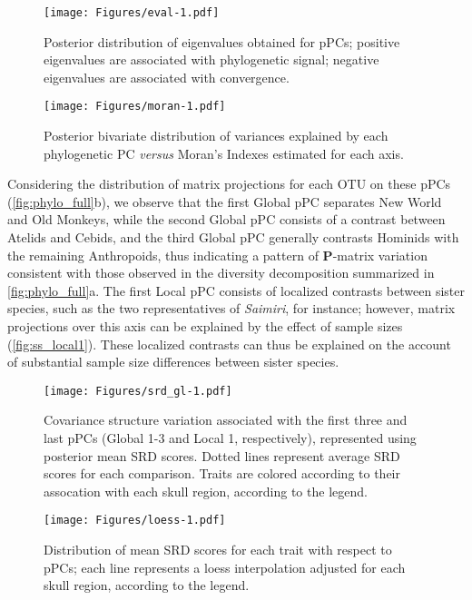 \documentclass[12pt,twoside]{report}
\begin{document}
\begin{figure}[htbp]
\centering
\texttt{[image: Figures/eval-1.pdf]}
\caption{Posterior distribution of eigenvalues obtained for pPCs;
positive eigenvalues are associated with phylogenetic signal; negative
eigenvalues are associated with convergence. \label{fig:eval}}
\end{figure}

\begin{figure}[htbp]
\centering
\texttt{[image: Figures/moran-1.pdf]}
\caption{Posterior bivariate distribution of variances explained by each
phylogenetic PC \emph{versus} Moran's Indexes estimated for each axis.
\label{fig:moran}}
\end{figure}

Considering the distribution of matrix projections for each OTU on these
pPCs (\autoref{fig:phylo_full}b), we observe that the first Global pPC
separates New World and Old Monkeys, while the second Global pPC
consists of a contrast between Atelids and Cebids, and the third Global
pPC generally contrasts Hominids with the remaining Anthropoids, thus
indicating a pattern of $\mathbf{P}$-matrix variation consistent with
those observed in the diversity decomposition summarized in
\autoref{fig:phylo_full}a. The first Local pPC consists of localized
contrasts between sister species, such as the two representatives of
\emph{Saimiri}, for instance; however, matrix projections over this axis
can be explained by the effect of sample sizes
(\autoref{fig:ss_local1}). These localized contrasts can thus be
explained on the account of substantial sample size differences between
sister species.

\begin{figure}[htbp]
\centering
\texttt{[image: Figures/srd\_gl-1.pdf]}
\caption{Covariance structure variation associated with the first three
and last pPCs (Global 1-3 and Local 1, respectively), represented using
posterior mean SRD scores. Dotted lines represent average SRD scores for
each comparison. Traits are colored according to their assocation with
each skull region, according to the legend. \label{fig:srd_gl}}
\end{figure}

\begin{figure}[htbp]
\centering
\texttt{[image: Figures/loess-1.pdf]}
\caption{Distribution of mean SRD scores for each trait with respect to
pPCs; each line represents a loess interpolation adjusted for each skull
region, according to the legend. \label{fig:loess}}
\end{figure}
\end{document}
